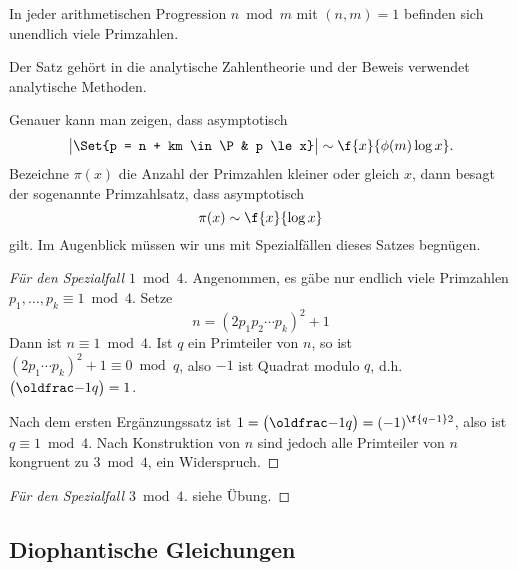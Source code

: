 \begin{st}[Dirichlet] \label{2.17}
	In jeder arithmetischen Progression $n \bmod m$ mit $(n,m) = 1$ befinden sich unendlich viele Primzahlen.
	\begin{note}
		Der Satz gehört in die analytische Zahlentheorie und der Beweis verwendet analytische Methoden.

		Genauer kann man zeigen, dass asymptotisch
		\[
			\big| \Set{p = n + km \in \P & p \le x} \big|
			\sim
			\f {x}{\phi(m) \log x}.
		\]
		Bezeichne $\pi(x)$ die Anzahl der Primzahlen kleiner oder gleich $x$, dann besagt der sogenannte Primzahlsatz, dass asymptotisch
		\[
			\pi(x) \sim \f{x}{\log x}
		\]
		gilt.
		Im Augenblick müssen wir uns mit Spezialfällen dieses Satzes begnügen.
	\end{note}
	\begin{proof}[Für den Spezialfall $1 \bmod 4$]
		Angenommen, es gäbe nur endlich viele Primzahlen $p_1, \dotsc, p_k \equiv 1 \bmod 4$.
		Setze
		\[
			n = (2 p_1 p_2 \dotsb p_k)^2 + 1
		\]
		Dann ist $n \equiv 1 \bmod 4$.
		Ist $q$ ein Primteiler von $n$, so ist $(2p_1\dotsb p_k)^2 + 1 \equiv 0 \bmod q$, also $-1$ ist Quadrat modulo $q$, d.h. $\legsym{-1}{q} = 1$.

		Nach dem ersten Ergänzungssatz ist $1 = \legsym{-1}{q} = (-1)^{\f{q-1}2}$, also ist $q \equiv 1 \bmod 4$.
		Nach Konstruktion von $n$ sind jedoch alle Primteiler von $n$ kongruent zu $3 \bmod 4$, ein Widerspruch.
	\end{proof}
	\begin{proof}[Für den Spezialfall $3 \bmod 4$]
		siehe Übung.
	\end{proof}
\end{st}

\subsection{Diophantische Gleichungen}


